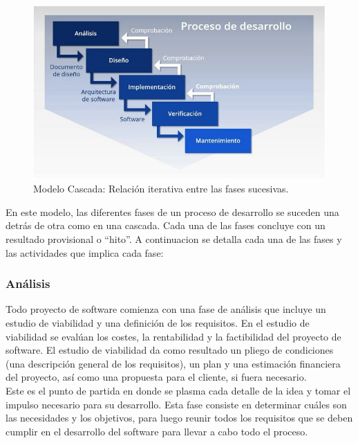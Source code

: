 \begin{figure}[H]
    \begin{center}
        \includegraphics[width=12cm]{img/capitulo_2/waterfall.jpeg}
    \end{center}
    \caption{Modelo Cascada: Relación iterativa entre las fases sucesivas.}
    \label{fig:cascada_iterativa}
\end{figure}

En este modelo, las diferentes fases de un proceso de desarrollo se suceden una detrás de otra como en una cascada. Cada una de las fases concluye con un resultado provisional o ``hito''. A continuacion se detalla cada una de las fases y las actividades que implica cada fase:

\subsubsection{Análisis}

Todo proyecto de software comienza con una fase de análisis que incluye un estudio de viabilidad y una definición de los requisitos. En el estudio de viabilidad se evalúan los costes, la rentabilidad y la factibilidad del proyecto de software. El estudio de viabilidad da como resultado un pliego de condiciones (una descripción general de los requisitos), un plan y una estimación financiera del proyecto, así como una propuesta para el cliente, si fuera necesario.\\

Este es el punto de partida en donde se plasma cada detalle de la idea y tomar el impulso necesario para su desarrollo. Esta fase consiste en determinar cuáles son las necesidades y los objetivos, para luego reunir todos los requisitos que se deben cumplir en el desarrollo del software para llevar a cabo todo el proceso.\\

